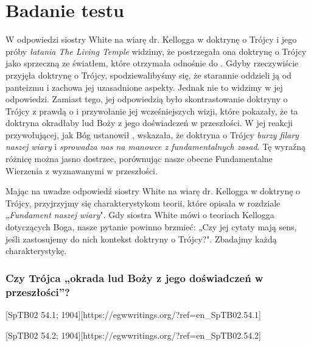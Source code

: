 \chapter{Badanie testu}

W odpowiedzi siostry White na wiarę dr. Kellogga w doktrynę o Trójcy i jego próby \textit{łatania} \textit{The Living Temple} widzimy, że postrzegała ona doktrynę o Trójcy jako sprzeczną ze światłem, które otrzymała odnośnie do . Gdyby rzeczywiście przyjęła doktrynę o Trójcy, spodziewalibyśmy się, że starannie oddzieli ją od panteizmu i zachowa jej uzasadnione aspekty. Jednak nie to widzimy w jej odpowiedzi. Zamiast tego, jej odpowiedzią było skontrastowanie doktryny o Trójcy z prawdą o  i przywołanie jej wcześniejszych wizji, które pokazały, że ta doktryna okradłaby lud Boży z jego doświadczeń w przeszłości. W jej reakcji przywołującej, jak Bóg ustanowił , wskazała, że doktryna o Trójcy \textit{burzy filary naszej wiary} i \textit{sprowadza nas na manowce z fundamentalnych zasad}. Tę wyraźną różnicę można jasno dostrzec, porównując nasze obecne Fundamentalne Wierzenia z  wyznawanymi w przeszłości.

Mając na uwadze odpowiedź siostry White na wiarę dr. Kellogga w doktrynę o Trójcy, przyjrzyjmy się charakterystykom teorii, które opisała w rozdziale „\textit{Fundament naszej wiary}". Gdy siostra White mówi o teoriach Kellogga dotyczących Boga, nasze pytanie powinno brzmieć: „Czy jej cytaty mają sens, jeśli zastosujemy do nich kontekst doktryny o Trójcy?". Zbadajmy każdą charakterystykę.

\subsection*{Czy Trójca „okrada lud Boży z jego doświadczeń w przeszłości”?}

[SpTB02 54.1; 1904][https://egwwritings.org/?ref=en\_SpTB02.54.1]

[SpTB02 54.2; 1904][https://egwwritings.org/?ref=en\_SpTB02.54.2]

